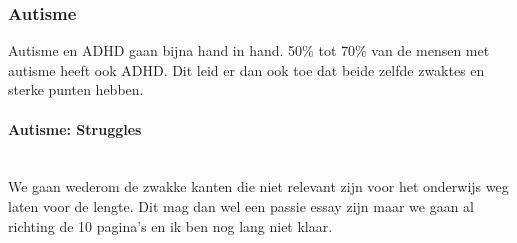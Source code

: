 \documentclass{article}
\begin{document}
            \subsubsection{Autisme}
                Autisme en ADHD gaan bijna hand in hand. 50\% tot 70\% van de mensen met autisme heeft ook ADHD\cite{ADHD-en-autisme-overlap}. Dit leid er dan ook toe dat beide zelfde zwaktes en sterke punten hebben.\\
                \noindent\paragraph{Autisme: Struggles}\\
                    We gaan wederom de zwakke kanten die niet relevant zijn voor het onderwijs weg laten voor de lengte. Dit mag dan wel een passie essay zijn maar we gaan al richting de 10 pagina's en ik ben nog lang niet klaar.
\end{document}
